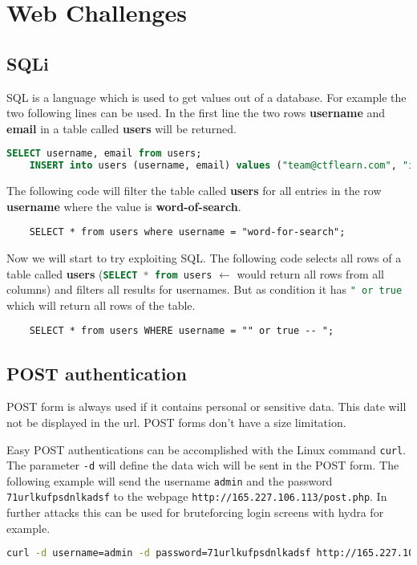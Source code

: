 
\section{Web Challenges}

\subsection{SQLi} SQL is a language which is used to get values out of a database. For example the two following lines can be used. In the first line the two rows \textbf{username} and \textbf{email} in a table called \textbf{users} will be returned.

\begin{lstlisting}[language=sql]
	SELECT username, email from users;
	INSERT into users (username, email) values ("team@ctflearn.com", "intelagent");
\end{lstlisting}

The following code will filter the table called \textbf{users} for all entries in the row \textbf{username} where the value is \textbf{word-of-search}.
\begin{lstlisting}
	SELECT * from users where username = "word-for-search";
\end{lstlisting}

Now we will start to try exploiting SQL. The following code selects all rows of a table called \textbf{users} (\lstinline[language=sql]|SELECT * from users| $\leftarrow$ would return all rows from all columns) and filters all results for usernames. But as condition it has \lstinline[language=sql]|" or true| which will return all rows of the table.

\begin{lstlisting}
	SELECT * from users WHERE username = "" or true -- ";
\end{lstlisting}

\subsection{POST authentication}
POST form is always used if it contains personal or sensitive data. This date will not be displayed in the url. POST forms don't have a size limitation.

Easy POST authentications can be accomplished with the Linux command \texttt{curl}. The parameter \texttt{-d} will define the data wich will be sent in the POST form. The following example will send the username \texttt{admin} and the password \texttt{71urlkufpsdnlkadsf} to the webpage \texttt{http://165.227.106.113/post.php}. In further attacks this can be used for bruteforcing login screens with hydra for example.

\begin{lstlisting}[language=bash]
	curl -d username=admin -d password=71urlkufpsdnlkadsf http://165.227.106.113/post.php
\end{lstlisting}